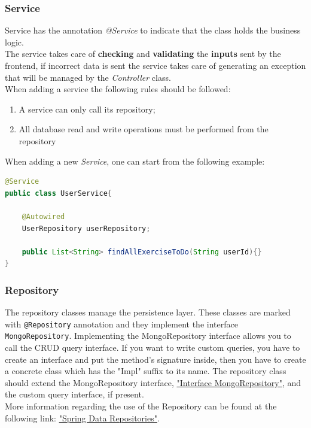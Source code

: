 \subsubsection{Service}
Service has the annotation \textit{@Service} to indicate that the class holds the business logic.\\
The service takes care of \textbf{checking} and \textbf{validating} the \textbf{inputs} sent by the frontend, if incorrect data is sent the service takes care of generating an exception that will be managed by the \textit{Controller} class.\\
When adding a service the following rules should be followed: 
\begin{enumerate}
\item A service can only call its repository;
\item All database read and write operations must be performed from the repository
\end{enumerate}
When adding a new \textit{Service}, one can start from the following example:
\begin{lstlisting}[language=Java]
@Service
public class UserService{

	@Autowired
	UserRepository userRepository; 
	
	public List<String> findAllExerciseToDo(String userId){} 
}
\end{lstlisting}

\subsubsection{Repository}
The repository classes manage the persistence layer. These classes are marked with \texttt{@Repository} annotation and they implement the interface \texttt{MongoRepository}. Implementing the MongoRepository interface allows you to call the CRUD query interface. 
If you want to write custom queries, you have to create an interface and put the method's signature inside, then you have to create a concrete class which has the "Impl" suffix to its name. The repository class should extend the MongoRepository interface, \href{https://docs.spring.io/spring-data/data-mongodb/docs/current/api/org/springframework/data/mongodb/repository/MongoRepository.html}{"Interface MongoRepository"}, and the custom query interface, if present.\\
More information regarding the use of the Repository can be found at the following link: \href{https://docs.spring.io/spring-data/mongodb/docs/2.1.5.RELEASE/reference/html/#repositories}{"Spring Data Repositories"}.
